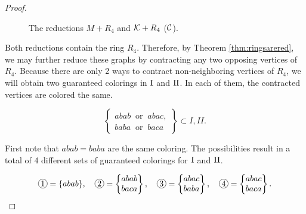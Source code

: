\begin{proof}
\begin{figure}[!ht]
    \caption{The reductions $M+R_4$ and $\mathcal{K}+R_4$ ($\mathcal{C}$).}
    \label{fig:ring4tut}
\end{figure}

Both reductions contain the ring $R_4$. Therefore, by Theorem \ref{thm:ringsarered}, we may further reduce these graphs by contracting any two opposing vertices of $R_4$. Because there are only 2 ways to contract non-neighboring vertices of $R_4$, we will obtain two guaranteed colorings in $\text{I}$ and $\text{II}$. In each of them, the contracted vertices are colored the same.

\begin{equation}
    \left\{\begin{matrix}
        abab \;\;\text{or}\;\; abac, \\
        baba \;\;\text{or}\;\; baca
    \end{matrix}\right\} \subset I,II.
\end{equation}

First note that $abab = baba$ are the same coloring. The possibilities result in a total of 4 different sets of guaranteed colorings for $\text{I}$ and $\text{II}$.

\needspace{2cm}
\begin{equation}
    \circled{1} = \{ abab \}, \quad \circled{2} = \left\{ \begin{matrix}abab \\ baca\end{matrix} \right\}, \quad \circled{3} = \left\{ \begin{matrix}abac \\ baba \end{matrix} \right\}, \quad \circled{4} = \left\{ \begin{matrix}abac \\ baca \end{matrix} \right\}.
\end{equation}


\end{proof}
